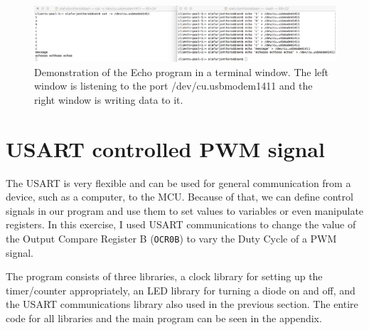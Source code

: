 \documentclass[11pt,a4paper,titlepage]{article}
\begin{document}
	\begin{figure}[h]
		\includegraphics[width=\textwidth]{graphics/message}
		\caption{Demonstration of the Echo program in a terminal window. The left window is listening to the port /dev/cu.usbmodem1411 and the right window is writing data to it.}
		\label{fig:message}
	\end{figure}
	
	\pagebreak
	\section{USART controlled PWM signal\label{sec:usartpwm}}
	
	The USART is very flexible and can be used for general communication from a device, such as a computer, to the MCU. Because of that, we can define control signals in our program and use them to set values to variables or even manipulate registers.
	In this exercise, I used USART communications to change the value of the Output Compare Register B (\verb|OCR0B|) to vary the Duty Cycle of a PWM signal.
	
	The program consists of three libraries, a clock library for setting up the timer/counter appropriately, an LED library for turning a diode on and off, and the USART communications library also used in the previous section.
	The entire code for all libraries and the main program can be seen in the appendix.
	
\end{document}
